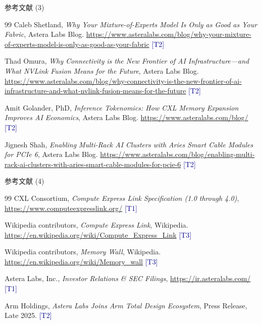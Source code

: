\documentclass[UTF8,11pt,aspectratio=169]{beamer}
\newcommand{\sourceT}[1]{{\small\textcolor{darkblue}{[T#1]}}}
\begin{document}
\begin{frame}{参考文献 (3)}
    \begin{thebibliography}{99}
        Caleb Shetland,
        \emph{Why Your Mixture-of-Experts Model Is Only as Good as Your Fabric},
        Astera Labs Blog.
        \url{https://www.asteralabs.com/blog/why-your-mixture-of-experts-model-is-only-as-good-as-your-fabric}
        \sourceT{2}

        Thad Omura,
        \emph{Why Connectivity is the New Frontier of AI Infrastructure—and What NVLink Fusion Means for the Future},
        Astera Labs Blog.
        \url{https://www.asteralabs.com/blog/why-connectivity-is-the-new-frontier-of-ai-infrastructure-and-what-nvlink-fusion-means-for-the-future}
        \sourceT{2}

        Amit Golander, PhD,
        \emph{Inference Tokenomics: How CXL Memory Expansion Improves AI Economics},
        Astera Labs Blog.
        \url{https://www.asteralabs.com/blog/}
        \sourceT{2}

        Jignesh Shah,
        \emph{Enabling Multi-Rack AI Clusters with Aries Smart Cable Modules for PCIe 6},
        Astera Labs Blog.
        \url{https://www.asteralabs.com/blog/enabling-multi-rack-ai-clusters-with-aries-smart-cable-modules-for-pcie-6}
        \sourceT{2}
    \end{thebibliography}
\end{frame}

\begin{frame}{参考文献 (4)}
    \begin{thebibliography}{99}
        CXL Consortium,
        \emph{Compute Express Link Specification (1.0 through 4.0)},
        \url{https://www.computeexpresslink.org/}
        \sourceT{1}

        Wikipedia contributors,
        \emph{Compute Express Link},
        Wikipedia.
        \url{https://en.wikipedia.org/wiki/Compute_Express_Link}
        \sourceT{3}

        Wikipedia contributors,
        \emph{Memory Wall},
        Wikipedia.
        \url{https://en.wikipedia.org/wiki/Memory_wall}
        \sourceT{3}

        Astera Labs, Inc.,
        \emph{Investor Relations \& SEC Filings},
        \url{https://ir.asteralabs.com/}
        \sourceT{1}

        Arm Holdings,
        \emph{Astera Labs Joins Arm Total Design Ecosystem},
        Press Release, Late 2025.
        \sourceT{2}
    \end{thebibliography}
\end{frame}
\end{document}
